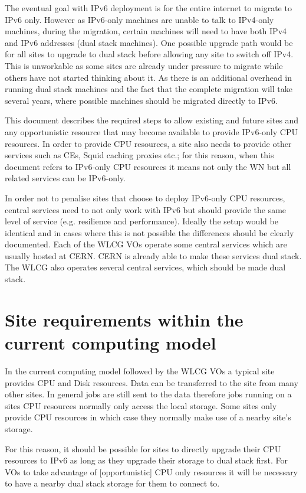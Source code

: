 \documentclass[11pt]{article}
\begin{document}
The eventual goal with IPv6 deployment is for the entire internet to migrate to IPv6 only.  However as IPv6-only machines are unable to talk to IPv4-only machines, during the migration, certain machines will need to have both IPv4 and IPv6 addresses (dual stack machines).  One possible upgrade path would be for all sites to upgrade to dual stack before allowing any site to switch off IPv4. This is unworkable as some sites are already under pressure to migrate while others have not started thinking about it.  As there is an additional overhead in running dual stack machines and the fact that the complete migration will take several years, where possible machines should be migrated directly to IPv6.  

This document describes the required steps to allow existing and future sites and any opportunistic resource that may become available to provide IPv6-only CPU resources. In order to provide CPU resources, a site also needs to provide other services such as CEs, Squid caching proxies etc.; for this reason, when this document refers to IPv6-only CPU resources it means not only the WN but all related services can be IPv6-only.

In order not to penalise sites that choose to deploy IPv6-only CPU resources, central services need to not only work with IPv6 but should provide the same level of service (e.g. resilience and performance).  Ideally the setup would be identical and in cases where this is not possible the differences should be clearly documented.  Each of the WLCG VOs operate some central services which are usually hosted at CERN. CERN is already able to make these services dual stack. The WLCG also operates several central services, which should be made dual stack.

\section{Site requirements within the current computing model}
In the current computing model followed by the WLCG VOs a typical site provides CPU and Disk resources.  Data can be transferred to the site from many other sites.  In general jobs are still sent to the data therefore jobs running on a sites CPU resources normally only access the local storage.  Some sites only provide CPU resources in which case they normally make use of a nearby site's storage.  

For this reason, it should be possible for sites to directly upgrade their CPU resources to IPv6 as long as they upgrade their storage to dual stack first.  For VOs to take advantage of [opportunistic] CPU only resources it will be necessary to have a nearby dual stack storage for them to connect to.
\end{document}
